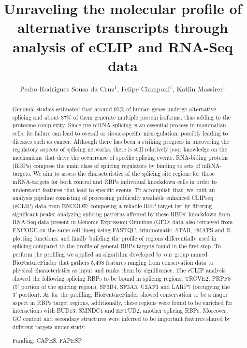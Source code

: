 \documentclass[twoside]{article}
\title{\vspace{-15mm}\fontsize{24pt}{10pt}\selectfont\textbf{Unraveling the molecular profile of alternative transcripts through analysis of eCLIP and RNA-Seq data}} %
\author{Pedro Rodrigues Sousa da Cruz$^1$, Felipe Ciamponi$^1$, Katlin Massirer$^1$}
\affil{1 CBMEG - UNICAMP\\ }
\date{}
\begin{document}
\maketitle %

\thispagestyle{fancy} %


\begin{abstract}
Genomic studies estimated that around 95\% of human genes undergo alternative splicing and about 37\% of them generate multiple protein isoforms, thus adding to the proteome complexity. Since pre-mRNA splicing is an essential process in mammalian cells, its failure can lead to overall or tissue-specific misregulation, possibly leading to diseases such as cancer. Although there has been a striking progress in uncovering the regulatory aspects of splicing networks, there is still relatively poor knowledge on the mechanisms that drive the occurrence of specific splicing events. RNA-biding proteins (RBPs) compose the main class of splicing regulators by binding to sets of mRNA-targets. We aim to assess the characteristics of the splicing site regions for those mRNA-targets for both control and RBPs individual knockdown cells in order to understand features that lead to specific events. To accomplish that, we built an analysis pipeline consisting of processing publically available enhanced CLIPseq (eCLIP) data from ENCODE; composing a reliable RBP-target list by filtering significant peaks; analyzing splicing patterns affected by these RBPs' knockdown from RNA-Seq data present in Genome Expression Omnibus (GEO; data also retrieved from ENCODE on the same cell lines) using FASTQC, trimmomatic, STAR, rMATS and R plotting functions; and finally building the profile of regions differentially used in splicing compared to the profile of general RBPs targets found in the first step. To perform the profiling we applied an algorithm developed by our group named BioFeatureFinder that gathers 5,498 features ranging from conservation data to physical characteristics as input and ranks them by significance. The eCLIP analysis showed the following splicing RBPs to be bound in splicing regions: TROVE2, PRPF8 (5' portion of the splicing region), SF3B4, SF3A3, U2AF1 and LARP7 (occupying the 3' portion). As for the profiling, BioFeatureFinder showed conservation to be a major aspect in RBPs target regions, additionally, these regions were found to be enriched for interactions with BUD13, SMNDC1 and EFTUD2, another splicing RBPs. Moreover, GC content and secondary structures were inferred to be important features shared by different targets under study.

Funding: CAPES, FAPESP
\end{abstract}
\end{document}
